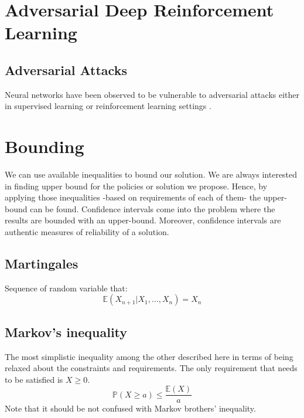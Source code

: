 \documentclass[a4paper,12pt]{article}
\begin{document}

\section{Adversarial Deep Reinforcement Learning}

\subsection{Adversarial Attacks}
Neural networks have been observed to be vulnerable to adversarial attacks either in supervised learning or reinforcement learning settings \cite{Huang2017}.


\section{Bounding}
We can use available inequalities to bound our solution. We are always interested in finding upper bound for the policies or solution we propose. Hence, by applying those inequalities -based on requirements of each of them- the upper-bound can be found. Confidence intervals come into the problem where the results are bounded with an upper-bound. Moreover, confidence intervals are authentic measures of reliability of a solution.

\subsection{Martingales}
Sequence of random variable that:
\begin{equation}
    \mathbb { E } \left( X _ { n + 1 } | X _ { 1 } , \ldots , X _ { n } \right) = X _ { n }
\end{equation}

\subsection{Markov's inequality}
The most simplistic inequality among the other described here in terms of being relaxed about the constraints and requirements. The only requirement that needs to be satisfied is $X \geq 0$.
\begin{equation}
\mathbb {P}(X \geq a ) \leq \frac { \mathbb { E}( X ) } { a }
\end{equation}
Note that it should be not confused with Markov brothers' inequality.
\end{document}
